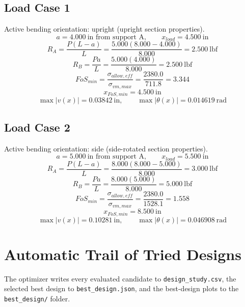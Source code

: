 \documentclass[11pt]{article}
\begin{document}
\subsection*{Load Case 1}
Active bending orientation: upright (upright section properties).
\[a = 4.000\ \mathrm{in} \text{ from support A}, \qquad x_{load} = 4.500\ \mathrm{in}\]
\[R_A = \frac{P(L-a)}{L} = \frac{5.000(8.000-4.000)}{8.000} = 2.500\ \mathrm{lbf}\]
\[R_B = \frac{Pa}{L} = \frac{5.000(4.000)}{8.000} = 2.500\ \mathrm{lbf}\]
\[FoS_{min} = \frac{\sigma_{allow,eff}}{\sigma_{vm,max}} = \frac{2380.0}{711.8} = 3.344\]
\[x_{FoS,min} = 4.500\ \mathrm{in}\]
\[\max |v(x)| = 0.03842\ \mathrm{in}, \qquad \max |\theta(x)| = 0.014619\ \mathrm{rad}\]
\subsection*{Load Case 2}
Active bending orientation: side (side-rotated section properties).
\[a = 5.000\ \mathrm{in} \text{ from support A}, \qquad x_{load} = 5.500\ \mathrm{in}\]
\[R_A = \frac{P(L-a)}{L} = \frac{8.000(8.000-5.000)}{8.000} = 3.000\ \mathrm{lbf}\]
\[R_B = \frac{Pa}{L} = \frac{8.000(5.000)}{8.000} = 5.000\ \mathrm{lbf}\]
\[FoS_{min} = \frac{\sigma_{allow,eff}}{\sigma_{vm,max}} = \frac{2380.0}{1528.1} = 1.558\]
\[x_{FoS,min} = 8.500\ \mathrm{in}\]
\[\max |v(x)| = 0.10281\ \mathrm{in}, \qquad \max |\theta(x)| = 0.046908\ \mathrm{rad}\]

\section*{Automatic Trail of Tried Designs}
The optimizer writes every evaluated candidate to \texttt{design\_study.csv}, the selected best design to \texttt{best\_design.json}, and the best-design plots to the \texttt{best\_design/} folder.
\end{document}
